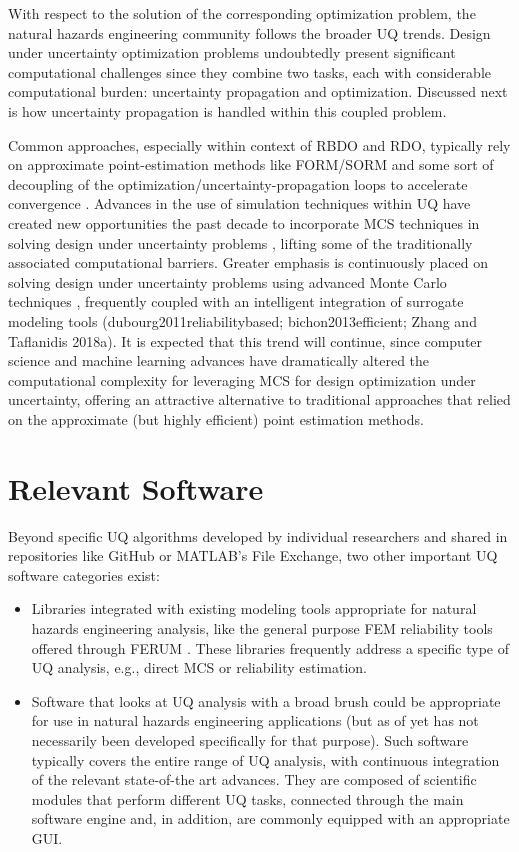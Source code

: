 With respect to the solution of the corresponding optimization problem, the natural hazards engineering community follows the broader UQ trends. Design under uncertainty optimization problems undoubtedly present significant computational challenges since they combine two tasks, each with considerable computational burden: uncertainty propagation and optimization. Discussed next is how uncertainty propagation is handled within this coupled problem.

Common approaches, especially within context of RBDO and RDO, typically rely on approximate point-estimation methods like FORM/SORM \citep{papadimitriou2018reliability} and some sort of decoupling of the optimization/uncertainty-propagation loops to accelerate convergence \citep{beyer2007robust}. Advances in the use of simulation techniques within UQ have created new opportunities the past decade to incorporate MCS techniques in solving design under uncertainty problems \citep{spall2003introduction,flint2016developing}, lifting some of the traditionally associated computational barriers. Greater emphasis is continuously placed on solving design under uncertainty problems using advanced Monte Carlo techniques \citep{medina2014adaptive}, frequently coupled with an intelligent integration of surrogate modeling tools (dubourg2011reliabilitybased; bichon2013efficient; Zhang and Taflanidis 2018a). It is expected that this trend will continue, since computer science and machine learning advances have dramatically altered the computational complexity for leveraging MCS for design optimization under uncertainty, offering an attractive alternative to traditional approaches that relied on the approximate (but highly efficient) point estimation methods.   

\section{Relevant Software}
\label{sec:uq_tools}

Beyond specific UQ algorithms developed by individual researchers and shared in repositories like GitHub or MATLAB’s File Exchange, two other important UQ software categories exist:

\begin{itemize}
    \item Libraries integrated with existing modeling tools appropriate for natural hazards engineering analysis, like the general purpose FEM reliability tools offered through FERUM \citep{bourinet2009review}. These libraries frequently address a specific type of UQ analysis, e.g., direct MCS or reliability estimation.
    \item Software that looks at UQ analysis with a broad brush could be appropriate for use in natural hazards engineering applications (but as of yet has not necessarily been developed specifically for that purpose). Such software typically covers the entire range of UQ analysis, with continuous integration of the relevant state-of-the art advances. They are composed of scientific modules that perform different UQ tasks, connected through the main software engine and, in addition, are commonly equipped with an appropriate GUI. 
\end{itemize}
	
